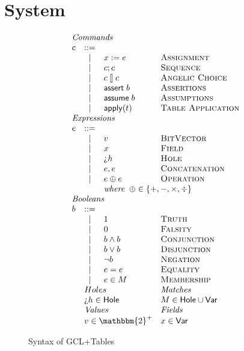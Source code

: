 \section{System}


\begin{figure}[ht]
  \[\begin{array}{l c l l}
      \multicolumn{4}{l}{\textit{Commands}}\\
      c & ::=& \\
        & \mid & x := e & \textsc{Assignment}\\
        & \mid & c;c & \textsc{Sequence} \\
        & \mid & c \angel c & \textsc{Angelic Choice}\\
        & \mid & \assert b & \textsc{Assertions} \\
        & \mid & \assume b & \textsc{Assumptions} \\
        & \mid & \apply t & \textsc{Table Application}\\
      \multicolumn{4}{l}{\textit{Expressions}} \\
      e & ::= & \\
        & \mid & v            & \textsc{BitVector} \\
        & \mid & x            & \textsc{Field} \\
        & \mid & \hole h       & \textsc{Hole} \\
        & \mid & e,e          & \textsc{Concatenation} \\
        & \mid & e \oplus e   & \textsc{Operation} \\
        & &  \multicolumn{2}{l}{\textit{where}\;\; \oplus \in \{+,-,\times, \div\}} \\
      \multicolumn{4}{l}{\textit{Booleans}}\\
      b & ::= & \\
        & \mid & \TRUE & \textsc{Truth} \\
        & \mid & \FALSE & \textsc{Falsity} \\
        & \mid & b \wedge b & \textsc{Conjunction} \\
        & \mid & b \vee b & \textsc{Disjunction} \\
        & \mid & \neg b & \textsc{Negation} \\
        & \mid & e = e & \textsc{Equality} \\
        & \mid & e \in M & \textsc{Membership} \\
      & \multicolumn{2}{l}{Holes} &\multicolumn{1}{l}{\textit{Matches}} \\
      & \multicolumn{2}{l}{\hole h \in \mathsf{Hole}} & \multicolumn{1}{l}{M \in \mathsf{Hole} \cup \mathsf{Var}}\\
      & \multicolumn{2}{l}{\textit{Values}} &  \multicolumn{1}{l}{\textit{Fields}} \\
      & \multicolumn{2}{l}{v \in \mathbbm{2}^+} & \multicolumn{1}{l}{x \in \mathsf{Var}}
    \end{array}\]

  \caption{Syntax of GCL+Tables}
  \label{fig:syntaxgcl}
  
\end{figure}


